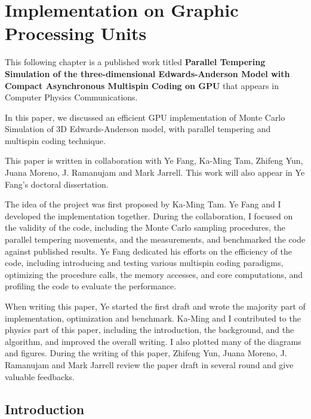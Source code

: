 \chapter{Implementation on Graphic Processing Units}
\label{chap:SG_imp}
This following chapter is a published work titled {\bf Parallel Tempering 
Simulation of the three-dimensional Edwards-Anderson Model  with  Compact 
Asynchronous Multispin Coding on GPU} that appears in Computer Physics Communications.

In this paper, we discussed an efficient GPU implementation of Monte Carlo 
Simulation of 3D Edwards-Anderson model, with parallel tempering and multispin 
coding technique. 

This paper is written in collaboration with Ye Fang, Ka-Ming Tam, Zhifeng Yun, 
Juana Moreno, J. Ramanujam and Mark Jarrell. 
This work will also appear in Ye Fang's doctoral dissertation. 

The idea of the project was first proposed by Ka-Ming Tam. 
Ye Fang and I developed the implementation together. 
During the collaboration, I focused on the validity of the code, including the 
Monte Carlo sampling procedures, the parallel tempering movements, and the 
measurements, and benchmarked the code against published results. 
Ye Fang dedicated his efforts on the efficiency of the code, including 
introducing and testing various multispin coding paradigms, optimizing the 
procedure calls, the memory accesses, and core computations, and profiling the 
code to evaluate the performance. 

When writing this paper, Ye started the first draft and wrote the majority part 
of implementation, optimization and benchmark. 
Ka-Ming and I contributed to the physics part of this paper, including the 
introduction, the background, and the algorithm, and improved the overall writing. 
I also plotted many of the diagrams and figures.
During the writing of this paper, Zhifeng Yun, Juana Moreno, J. Ramanujam and 
Mark Jarrell  review the paper draft in several round and give valuable 
feedbacks.


\section{Introduction}

